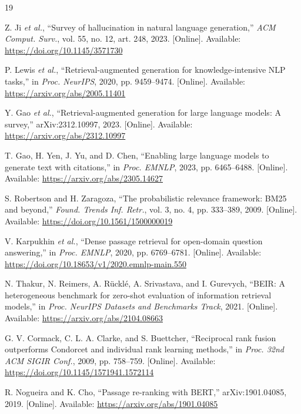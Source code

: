 \documentclass[conference]{IEEEtran}
\begin{document}
\begin{thebibliography}{19}
\footnotesize

Z. Ji \emph{et al.}, ``Survey of hallucination in natural language
generation,'' \emph{ACM Comput. Surv.}, vol. 55, no. 12, art. 248, 2023.
[Online]. Available: \url{https://doi.org/10.1145/3571730}

P. Lewis \emph{et al.}, ``Retrieval-augmented generation for knowledge-intensive
NLP tasks,'' in \emph{Proc. NeurIPS}, 2020, pp. 9459--9474. [Online]. Available:
\url{https://arxiv.org/abs/2005.11401}

Y. Gao \emph{et al.}, ``Retrieval-augmented generation for large language
models: A survey,'' arXiv:2312.10997, 2023. [Online]. Available:
\url{https://arxiv.org/abs/2312.10997}

T. Gao, H. Yen, J. Yu, and D. Chen, ``Enabling large language models to
generate text with citations,'' in \emph{Proc. EMNLP}, 2023, pp. 6465--6488.
[Online]. Available: \url{https://arxiv.org/abs/2305.14627}

S. Robertson and H. Zaragoza, ``The probabilistic relevance framework: BM25 and
beyond,'' \emph{Found. Trends Inf. Retr.}, vol. 3, no. 4, pp. 333--389, 2009.
[Online]. Available: \url{https://doi.org/10.1561/1500000019}

V. Karpukhin \emph{et al.}, ``Dense passage retrieval for open-domain question
answering,'' in \emph{Proc. EMNLP}, 2020, pp. 6769--6781. [Online]. Available:
\url{https://doi.org/10.18653/v1/2020.emnlp-main.550}

N. Thakur, N. Reimers, A. R\"uckl\'e, A. Srivastava, and I. Gurevych, ``BEIR: A
heterogeneous benchmark for zero-shot evaluation of information retrieval
models,'' in \emph{Proc. NeurIPS Datasets and Benchmarks Track}, 2021.
[Online]. Available: \url{https://arxiv.org/abs/2104.08663}

G. V. Cormack, C. L. A. Clarke, and S. Buettcher, ``Reciprocal rank fusion
outperforms Condorcet and individual rank learning methods,'' in \emph{Proc.
32nd ACM SIGIR Conf.}, 2009, pp. 758--759. [Online]. Available:
\url{https://doi.org/10.1145/1571941.1572114}

R. Nogueira and K. Cho, ``Passage re-ranking with BERT,'' arXiv:1901.04085,
2019. [Online]. Available: \url{https://arxiv.org/abs/1901.04085}


\end{thebibliography}
\end{document}
